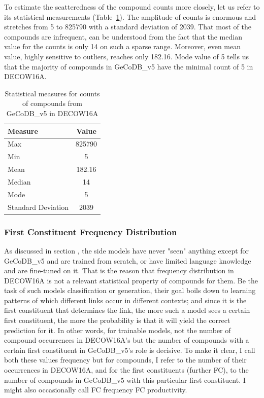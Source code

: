 \documentclass[11pt]{article}
\begin{document}
To estimate the scatteredness of the compound counts more closely, let us refer to its statistical measurements (Table~\ref{tab:comp_stats}). The amplitude of counts is enormous and stretches from 5 to 825790 with a standard deviation of 2039. That most of the compounds are infrequent, can be understood from the fact that the median value for the counts is only 14 on such a sparse range. Moreover, even mean value, highly sensitive to outliers, reaches only 182.16. Mode value of 5 tells us that the majority of compounds in GeCoDB\_v5 have the minimal count of 5 in DECOW16A. 

\begin{table}[hbt!]
\centering
\begin{tabular}{|l|c|}
\hline
\textbf{Measure} & \textbf{Value} \\ \hline
Max   & 825790 \\ \hline
Min   & 5 \\ \hline
Mean  & 182.16 \\ \hline
Median & 14 \\ \hline
Mode  & 5 \\ \hline
Standard Deviation    & 2039 \\ \hline
\end{tabular}
\caption{Statistical measures for counts of compounds from GeCoDB\_v5 in DECOW16A}
\label{tab:comp_stats}
\end{table}


\subsubsection{First Constituent Frequency Distribution}
\label{sec:fc_stats}

As discussed in section , the side models have never "seen" anything except for GeCoDB\_v5 and are trained from scratch, or have limited language knowledge and are fine-tuned on it. That is the reason that frequency distribution in DECOW16A is not a relevant statistical property of compounds for them. Be the task of such models classification or generation, their goal boils down to learning patterns of which different links occur in different contexts; and since it is the first constituent that determines the link, the more such a model sees a certain first constituent, the more the probability is that it will yield the correct prediction for it. In other words, for trainable models, not the number of compound occurrences in DECOW16A's but the number of compounds with a certain first constituent in GeCoDB\_v5's role is decisive. To make it clear, I call both these values frequency but for compounds, I refer to the number of their occurrences in DECOW16A, and for the first constituents (further FC), to the number of compounds in GeCoDB\_v5 with this particular first constituent. I might also occasionally call FC frequency FC productivity.
\end{document}
